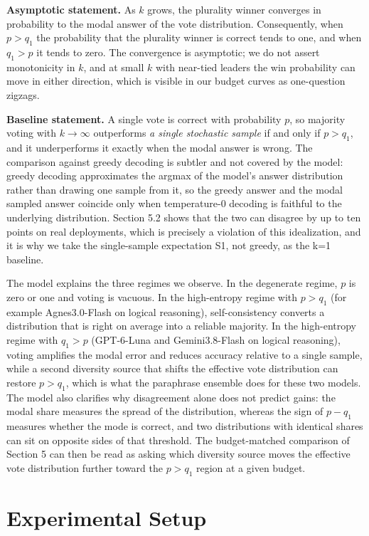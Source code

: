 \documentclass[preprint,12pt]{elsarticle}
\begin{document}
\textbf{Asymptotic statement.} As $k$ grows, the plurality winner converges in probability to the modal answer of the vote distribution. Consequently, when $p > q_1$ the probability that the plurality winner is correct tends to one, and when $q_1 > p$ it tends to zero. The convergence is asymptotic; we do not assert monotonicity in $k$, and at small $k$ with near-tied leaders the win probability can move in either direction, which is visible in our budget curves as one-question zigzags.

\textbf{Baseline statement.} A single vote is correct with probability $p$, so majority voting with $k \to \infty$ outperforms \emph{a single stochastic sample} if and only if $p > q_1$, and it underperforms it exactly when the modal answer is wrong. The comparison against greedy decoding is subtler and not covered by the model: greedy decoding approximates the argmax of the model's answer distribution rather than drawing one sample from it, so the greedy answer and the modal sampled answer coincide only when temperature-$0$ decoding is faithful to the underlying distribution. Section 5.2 shows that the two can disagree by up to ten points on real deployments, which is precisely a violation of this idealization, and it is why we take the single-sample expectation S1, not greedy, as the k=1 baseline.

The model explains the three regimes we observe. In the degenerate regime, $p$ is zero or one and voting is vacuous. In the high-entropy regime with $p > q_1$ (for example Agnes3.0-Flash on logical reasoning), self-consistency converts a distribution that is right on average into a reliable majority. In the high-entropy regime with $q_1 > p$ (GPT-6-Luna and Gemini3.8-Flash on logical reasoning), voting amplifies the modal error and reduces accuracy relative to a single sample, while a second diversity source that shifts the effective vote distribution can restore $p > q_1$, which is what the paraphrase ensemble does for these two models. The model also clarifies why disagreement alone does not predict gains: the modal share measures the spread of the distribution, whereas the sign of $p - q_1$ measures whether the mode is correct, and two distributions with identical shares can sit on opposite sides of that threshold. The budget-matched comparison of Section 5 can then be read as asking which diversity source moves the effective vote distribution further toward the $p > q_1$ region at a given budget.

\section{Experimental Setup}
\end{document}

